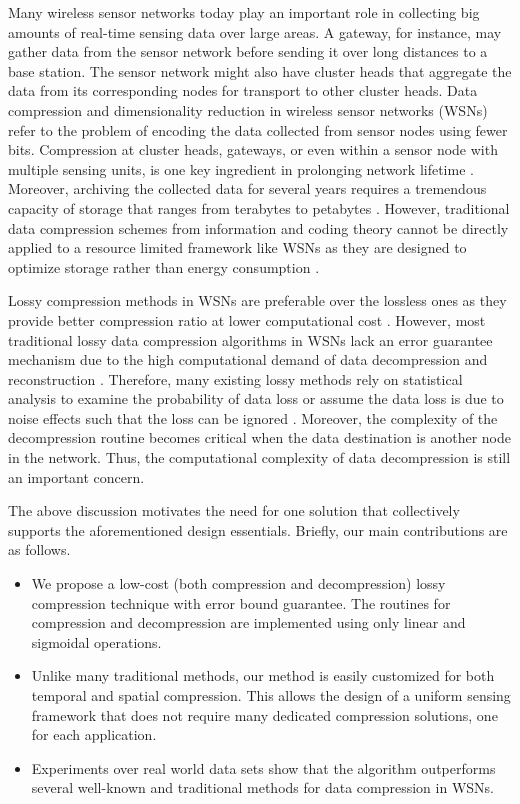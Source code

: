 \documentclass[a4paper,onecolumn,conference]{IEEEtran}
\begin{document}
Many wireless sensor networks today play an important role in collecting big amounts of real-time sensing data over large areas. A gateway, for instance, may gather data from the sensor network before sending it over long distances to a base station. The sensor network might also have cluster heads that aggregate the data from its corresponding nodes for transport to other cluster heads. Data compression and dimensionality reduction in wireless sensor networks (WSNs) refer to the problem of encoding the data collected from sensor nodes using fewer bits. Compression at cluster heads, gateways, or even within a sensor node with multiple sensing units, is one key ingredient in prolonging network lifetime \cite{fasolo2007network}. Moreover, archiving the collected data for several years requires a tremendous capacity of storage that ranges from terabytes to petabytes \cite{gandhi2009gamps}. However, traditional data compression schemes from information and coding theory cannot be directly applied to a resource limited framework like WSNs as they are designed to optimize storage rather than energy consumption \cite{razzaque2013compression}. 

Lossy compression methods in WSNs are preferable over the lossless ones as they provide better compression ratio at lower computational cost \cite{razzaque2013compression}. However, most traditional lossy data compression algorithms in WSNs lack an error guarantee mechanism due to the high computational demand of data decompression and reconstruction \cite{razzaque2013compression}. Therefore, many existing lossy methods rely on statistical analysis to examine the probability of data loss or assume the data loss is due to noise effects such that the loss can be ignored \cite{Srisooksai201237}. Moreover, the complexity of the decompression routine becomes critical when the data destination is another node in the network. Thus, the computational complexity of data decompression is still an important concern.

The above discussion motivates the need for one solution that collectively supports the aforementioned design essentials. Briefly, our main contributions are as follows.
\begin{itemize}
	\item We propose a low-cost (both compression and decompression) lossy compression technique with error bound guarantee. The routines for compression and decompression are implemented using only linear and sigmoidal operations.
	\item Unlike many traditional methods, our method is easily customized for both temporal and spatial compression. This allows the design of a uniform sensing framework that does not require many dedicated compression solutions, one for each application.
\item Experiments over real world data sets show that the algorithm outperforms several well-known and traditional methods for data compression in WSNs.
\end{itemize}
\end{document}
